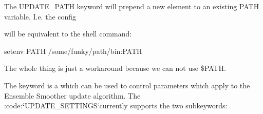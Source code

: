 \documentclass[a4paper,10pt,english]{sphinxmanual}
\begin{document}
\begin{sphinxShadowBox}

The UPDATE\_PATH keyword will prepend a new element to an existing PATH
variable. I.e. the config

%
\begin{sphinxVerbatim}[commandchars=\\\{\}]
     
\end{sphinxVerbatim}

will be equivalent to the shell command:

%
\begin{sphinxVerbatim}[commandchars=\\\{\}]
setenv PATH /some/funky/path/bin:\PYGZdl{}PATH
\end{sphinxVerbatim}

The whole thing is just a workaround because we can not use \$PATH.
\end{sphinxShadowBox}
\label{\detokenize{keywords/index:update-settings}}
The  keyword is a  which can be used to
control parameters which apply to the Ensemble Smoother update algorithm. The
:code:{\color{red}\bfseries{}{}`}UPDATE\_SETTINGS{}`currently supports the two subkeywords:
\end{document}

